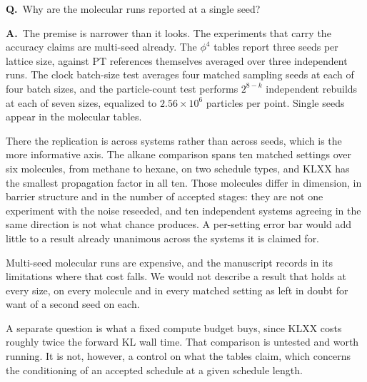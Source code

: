 \documentclass[11pt]{article}
\newcounter{qa}
\newcommand{\QA}[2]{%
  \par\bigskip
  \noindent\textbf{Q\theqa.}~#1\par
  \medskip
  \noindent\textbf{A\theqa.}~#2\par
  \medskip
}
\newcommand{\Q}[1]{\refstepcounter{qa}\QA{#1}}
\begin{document}
\Q{Why are the molecular runs reported at a single seed?}
{The premise is narrower than it looks. The experiments that carry the accuracy
claims are multi-seed already. The $\phi^4$ tables report three seeds per
lattice size, against PT references themselves averaged over three independent
runs. The clock batch-size test averages four matched sampling seeds at each of
four batch sizes, and the particle-count test performs $2^{8-k}$ independent
rebuilds at each of seven sizes, equalized to $2.56\times10^6$ particles per
point. Single seeds appear in the molecular tables.

There the replication is across systems rather than across seeds, which is the
more informative axis. The alkane comparison spans ten matched settings over six
molecules, from methane to hexane, on two schedule types, and KLXX has the
smallest propagation factor in all ten. Those molecules differ in dimension, in
barrier structure and in the number of accepted stages: they are not one
experiment with the noise reseeded, and ten independent systems agreeing in the
same direction is not what chance produces. A per-setting error bar would add
little to a result already unanimous across the systems it is claimed for.

Multi-seed molecular runs are expensive, and the manuscript records in its
limitations where that cost falls. We would not describe a result that holds at
every size, on every molecule and in every matched setting as left in doubt for
want of a second seed on each.

A separate question is what a fixed compute budget buys, since KLXX costs
roughly twice the forward KL wall time. That comparison is untested and worth
running. It is not, however, a control on what the tables claim, which concerns
the conditioning of an accepted schedule at a given schedule length.}



\end{document}
